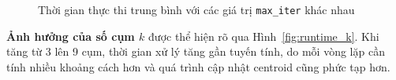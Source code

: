 \begin{figure}[H]
  \centering
  \hfill

  \hfill
  \caption{Thời gian thực thi trung bình với các giá trị \texttt{max\_iter} khác nhau}
  \label{fig:runtime_maxiter}
\end{figure}

\textbf{Ảnh hưởng của số cụm \(k\)} được thể hiện rõ qua Hình~\ref{fig:runtime_k}. Khi tăng từ 3 lên 9 cụm, thời gian xử lý tăng gần tuyến tính, do mỗi vòng lặp cần tính nhiều khoảng cách hơn và quá trình cập nhật centroid cũng phức tạp hơn.

